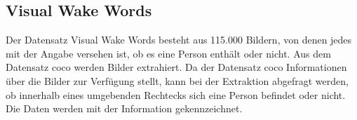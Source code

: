 %
%
%



\subsection{Visual Wake Words}

Der Datensatz \glqq Visual Wake Words\grqq{}  besteht aus 115.000 Bildern, von denen jedes mit der Angabe versehen ist, ob es eine Person enthält oder nicht. \cite{Chowdhery:2019} %
Aus dem Datensatz \ac{coco} werden Bilder extrahiert. Da der Datensatz \ac{coco} Informationen über die Bilder zur Verfügung stellt, kann bei der Extraktion abgefragt werden, ob innerhalb eines umgebenden Rechtecks sich eine Person befindet oder nicht. Die Daten werden mit der Information gekennzeichnet.




